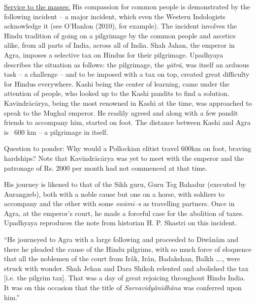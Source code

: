 \begin{enumerate}
 \underline{Service to the masses:} His compassion for common people is demonstrated by the following incident – a major incident, which even the Western Indologists acknowledge it (see O’Hanlon (2010), for example). The incident involves the Hindu tradition of going on a pilgrimage by the common people and ascetics alike, from all parts of India, across all of India. Shah Jahan, the emperor in Agra, imposes a selective tax on Hindus for their pilgrimage. Upadhyaya describes the situation as follows: the pilgrimage, the \textit{yātrā}, was itself an arduous task – a challenge – and to be imposed with a tax on top, created great difficulty for Hindus everywhere. Kashi being the center of learning, came under the attention of people, who looked up to the Kashi pandits to find a solution. Kavīndrācārya, being the most renowned in Kashi at the time, was approached to speak to the Mughal emperor. He readily agreed and along with a few pandit friends to accompany him, started on foot. The distance between Kashi and Agra is ~600 km – a pilgrimage in itself.

 Question to ponder: Why would a Pollockian elitist travel 600km on foot, braving hardships? Note that Kavīndrācārya was yet to meet with the emperor and the patronage of Rs. 2000 per month had not commenced at that time.

 His journey is likened to that of the Sikh guru, Guru Teg Bahadur (executed by Aurangzeb), both with a noble cause but one on a horse, with soldiers to accompany and the other with some \textit{swāmī--s} as travelling partners. Once in Agra, at the emperor’s court, he made a forceful case for the abolition of taxes. Upadhyaya reproduces the note from historian H. P. Shastri on this incident.

\begin{myquote}
“He journeyed to Agra with a large following and proceeded to Diwânâm and there he pleaded the cause of the Hindu pilgrims, with so much force of eloquence that all the noblemen of the court from Irâk, Irân, Badakshan, Balkh …., were struck with wonder. Shah Jehan and Dara Shikoh relented and abolished the tax [i.e. the pilgrim tax]. That was a day of great rejoicing throughout Hindu India. It was on this occasion that the title of \textit{Sarvavidyânidhâna} was conferred upon him.” 


\end{myquote}
\end{enumerate}
